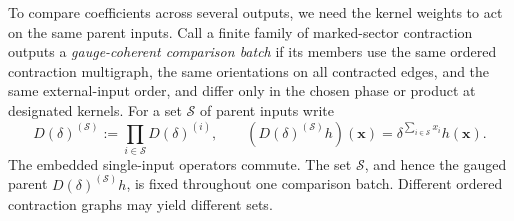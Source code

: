 \documentclass[11pt,letterpaper,onecolumn]{article}
\theoremstyle{plain}
\theoremstyle{definition}
\theoremstyle{remark}
\begin{document}
To compare coefficients across several outputs, we need the kernel
weights to act on the same parent inputs. Call a finite family of
marked-sector contraction outputs a \emph{gauge-coherent comparison batch} if its members use the same ordered contraction
multigraph, the same orientations on all contracted edges, and the same
external-input order, and differ only in the chosen phase or product at
designated kernels.  For a set \(\mathscr S\) of parent inputs write
\[
 D(\delta)^{(\mathscr S)}:=\prod_{i\in\mathscr S}D(\delta)^{(i)},
 \qquad
 (D(\delta)^{(\mathscr S)}h)({\mathbf{x}})
   =\delta^{\sum_{i\in\mathscr S}x_i}h({\mathbf{x}}).
\]
The embedded single-input operators commute.  The set \(\mathscr S\), and
hence the gauged parent \(D(\delta)^{(\mathscr S)}h\), is fixed throughout
one comparison batch.  Different ordered contraction graphs may yield
different sets.
\end{document}
